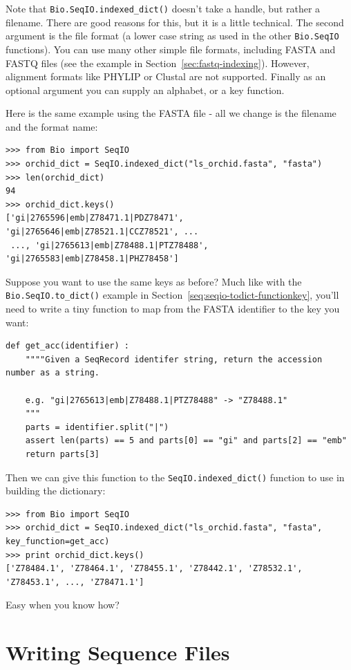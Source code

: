\documentclass{report}
\begin{document}
\noindent Note that \verb|Bio.SeqIO.indexed_dict()| doesn't take a handle,
but rather a filename. There are good reasons for this, but it is a little
technical. The second argument is the file format (a lower case string as
used in the other \verb|Bio.SeqIO| functions). You can use many other
simple file formats, including FASTA and FASTQ files (see the example in
Section~\ref{sec:fastq-indexing}). However, alignment
formats like PHYLIP or Clustal are not supported. Finally as an optional
argument you can supply an alphabet, or a key function.

Here is the same example using the FASTA file - all we change is the
filename and the format name:

\begin{verbatim}
>>> from Bio import SeqIO
>>> orchid_dict = SeqIO.indexed_dict("ls_orchid.fasta", "fasta")
>>> len(orchid_dict)
94
>>> orchid_dict.keys()
['gi|2765596|emb|Z78471.1|PDZ78471', 'gi|2765646|emb|Z78521.1|CCZ78521', ...
 ..., 'gi|2765613|emb|Z78488.1|PTZ78488', 'gi|2765583|emb|Z78458.1|PHZ78458']
\end{verbatim}

Suppose you want to use the same keys as before? Much like with the
\verb|Bio.SeqIO.to_dict()| example in Section~\ref{seq:seqio-todict-functionkey},
you'll need to write a tiny function to map from the FASTA identifier to the key
you want:

\begin{verbatim}
def get_acc(identifier) :
    """"Given a SeqRecord identifer string, return the accession number as a string.
  
    e.g. "gi|2765613|emb|Z78488.1|PTZ78488" -> "Z78488.1"
    """
    parts = identifier.split("|")
    assert len(parts) == 5 and parts[0] == "gi" and parts[2] == "emb"
    return parts[3]
\end{verbatim}

\noindent Then we can give this function to the \verb|SeqIO.indexed_dict()|
function to use in building the dictionary:

\begin{verbatim}
>>> from Bio import SeqIO
>>> orchid_dict = SeqIO.indexed_dict("ls_orchid.fasta", "fasta", key_function=get_acc)
>>> print orchid_dict.keys()
['Z78484.1', 'Z78464.1', 'Z78455.1', 'Z78442.1', 'Z78532.1', 'Z78453.1', ..., 'Z78471.1']
\end{verbatim}

\noindent Easy when you know how?


\section{Writing Sequence Files}
\end{document}
